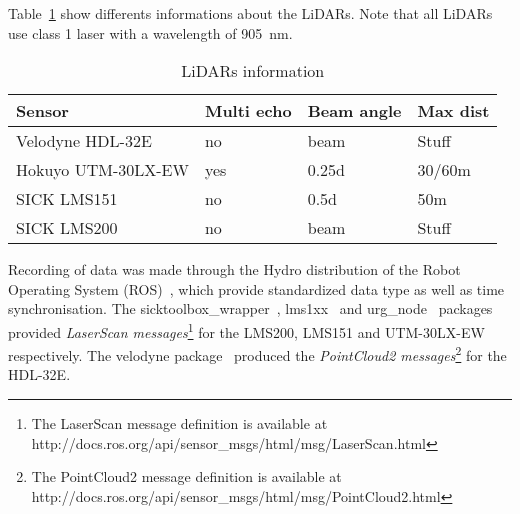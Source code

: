Table~\ref{tab:lidars} show differents informations about the LiDARs. Note that all LiDARs use class 1 laser with a wavelength of \SI{905}{\nano\meter}.
\begin{table}[htbp]
    \centering
    \begin{tabularx}{\linewidth}{|X||X|X|X|}\hline
        Sensor              & Multi echo & Beam angle & Max dist     \\ \hline%
        Velodyne HDL-32E    & no         & beam       & Stuff        \\ \hline
        Hokuyo UTM-30LX-EW  & yes        & 0.25d      & 30/60m       \\ \hline%
        SICK LMS151         & no         & 0.5d       & 50m          \\ \hline%
        SICK LMS200         & no         & beam       & Stuff        \\ \hline
    \end{tabularx}
    \caption{LiDARs information}\label{tab:lidars}
\end{table}

Recording of data was made through the Hydro distribution of the Robot Operating System (ROS)~\cite{ROSWeb}, which provide standardized data type as well as time synchronisation. The sicktoolbox\_wrapper~\cite{LMS200Web}, lms1xx~\cite{LMS151Web} and urg\_node~\cite{HokuyoWeb} packages provided \textit{LaserScan messages}\footnote{The LaserScan message definition is available at http://docs.ros.org/api/sensor\_msgs/html/msg/LaserScan.html} for the LMS200, LMS151 and UTM-30LX-EW respectively. The velodyne package~\cite{VelodyneWeb} produced the \textit{PointCloud2 messages}\footnote{The PointCloud2 message definition is available at http://docs.ros.org/api/sensor\_msgs/html/msg/PointCloud2.html} for the HDL-32E.
